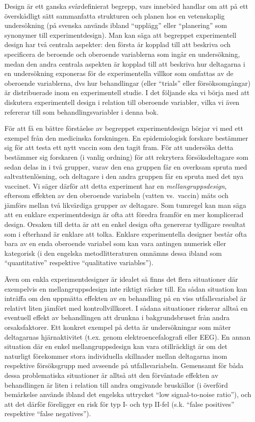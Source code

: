 \documentclass[
]{book}
\begin{document}
Design är ett ganska svårdefinierat begrepp, vars innebörd handlar om att på ett överskådligt sätt sammanfatta strukturen och planen hos en vetenskaplig undersökning (på svenska används ibland ``upplägg'' eller ``planering'' som synonymer till experimentdesign). Man kan säga att begreppet experimentell design har två centrala aspekter: den första är kopplad till att beskriva och specificera de beroende och oberoende variablerna som ingår en undersökning, medan den andra centrala aspekten är kopplad till att beskriva hur deltagarna i en undersökning exponeras för de experimentella villkor som omfattas av de oberoende variablerna, dvs hur behandlingar (eller ``trials'' eller försöksomgångar) är distribuerade inom en experimentell studie. I det följande ska vi börja med att diskutera experimentell design i relation till oberoende variabler, vilka vi även refererar till som behandlingsvariabler i denna bok.

För att få en bättre förståelse av begreppet experimentdesign börjar vi med ett exempel från den medicinska forskningen. En epidemiologisk forskare bestämmer sig för att testa ett nytt vaccin som den tagit fram. För att undersöka detta bestämmer sig forskaren (i vanlig ordning) för att rekrytera försöksdeltagare som sedan delas in i två grupper, varav den ena gruppen får en overksam spruta med saltvattenlösning, och deltagare i den andra gruppen får en spruta med det nya vaccinet. Vi säger därför att detta experiment har en \emph{mellangruppsdesign}, eftersom effekten av den oberoende variabeln (vatten vs.~vaccin) mäts och jämförs mellan två likvärdiga grupper av deltagare. Som tumregel kan man säga att en enklare experimentdesign är ofta att föredra framför en mer komplicerad design. Orsaken till detta är att en enkel design ofta genererar tydligare resultat som i efterhand är enklare att tolka. Enklare experimentella designer består ofta bara av en enda oberoende variabel som kan vara antingen numerisk eller kategorisk (i den engelska metodlitteraturen omnämns dessa ibland som ``quantitative'' respektive ``qualitative variables'').

Även om enkla experimentdesigner är idealet så finns det flera situationer där exempelvis en mellangruppsdesign inte riktigt räcker till. En sådan situation kan inträffa om den uppmätta effekten av en behandling på en viss utfallsvariabel är relativt liten jämfört med kontrollvillkoret. I sådana situationer riskerar alltså en eventuell effekt av behandlingen att drunkna i bakgrundsbruset från andra orsaksfaktorer. Ett konkret exempel på detta är undersökningar som mäter deltagarnas hjärnaktivitet (t.ex. genom elektroencefalografi eller EEG). En annan situation där en enkel mellangruppsdesign kan vara otillräckligt är om det naturligt förekommer stora individuella skillnader mellan deltagarna inom respektive försöksgrupp med avseende på utfallsvariabeln. Gemensamt för båda dessa problematiska situationer är alltså att den förväntade effekten av behandlingen är liten i relation till andra omgivande bruskällor (i överförd bemärkelse används ibland det engelska uttrycket ``low signal-to-noise ratio''), och att det därför föreligger en risk för typ I- och typ II-fel (s.k. ``false positives'' respektive ``false negatives'').
\end{document}
